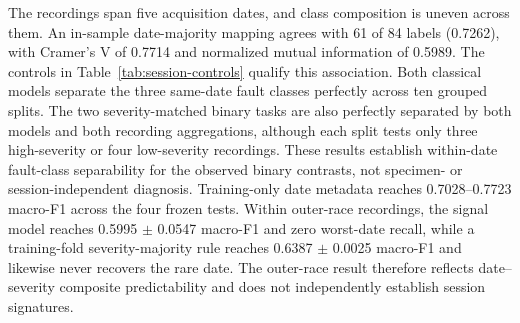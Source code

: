 \documentclass[11pt]{article}
\begin{document}
The recordings span five acquisition dates, and class composition is uneven across them. An in-sample date-majority mapping agrees with 61 of 84 labels (0.7262), with Cramer's V of 0.7714 and normalized mutual information of 0.5989. The controls in Table~\ref{tab:session-controls} qualify this association. Both classical models separate the three same-date fault classes perfectly across ten grouped splits. The two severity-matched binary tasks are also perfectly separated by both models and both recording aggregations, although each split tests only three high-severity or four low-severity recordings. These results establish within-date fault-class separability for the observed binary contrasts, not specimen- or session-independent diagnosis. Training-only date metadata reaches 0.7028--0.7723 macro-F1 across the four frozen tests. Within outer-race recordings, the signal model reaches 0.5995 $\pm$ 0.0547 macro-F1 and zero worst-date recall, while a training-fold severity-majority rule reaches 0.6387 $\pm$ 0.0025 macro-F1 and likewise never recovers the rare date. The outer-race result therefore reflects date--severity composite predictability and does not independently establish session signatures.

\begin{table}[H]
\centering
\caption{Comparative partition and acquisition-date controls. Split variability uses ten split seeds with model seed 42. Same-date results use recording-level probability aggregation; the outer-race date task uses ten repeated source-grouped folds.}
\label{tab:session-controls}
\small
{}
\end{table}
\end{document}
